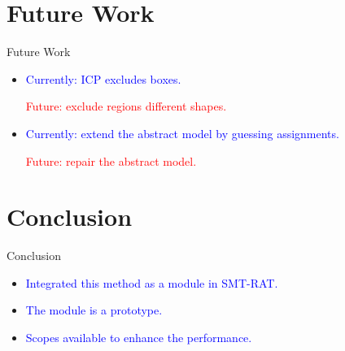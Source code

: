 \documentclass[]{beamer}
\begin{document}
\section{Future Work}
\begin{frame}{Future Work}
    \begin{itemize}
        \item \textcolor<1>{blue}{Currently: ICP excludes boxes.}\newline
        
        \textcolor<1>{red}{Future: exclude regions different shapes.}
        \bigskip
        \bigskip
        \item \textcolor<2>{blue}{Currently: extend the abstract model by guessing assignments.}\newline
        
        \textcolor<2>{red}{Future: repair the abstract model.}
    \end{itemize} 
\end{frame}

\section{Conclusion}
\begin{frame}{Conclusion}
    \begin{itemize}
        \item \textcolor<1>{blue}{Integrated this method as a module in SMT-RAT.}
        \bigskip
        \item \textcolor<1>{blue}{The module is a prototype.}
        \bigskip
        \item \textcolor<1>{blue}{Scopes available to enhance the performance.}
    \end{itemize}
\end{frame}
\end{document}

